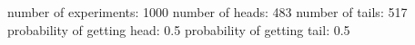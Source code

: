 number of experiments: 1000
number of heads: 483
number of tails: 517
probability of getting head: 0.5
probability of getting tail: 0.5
